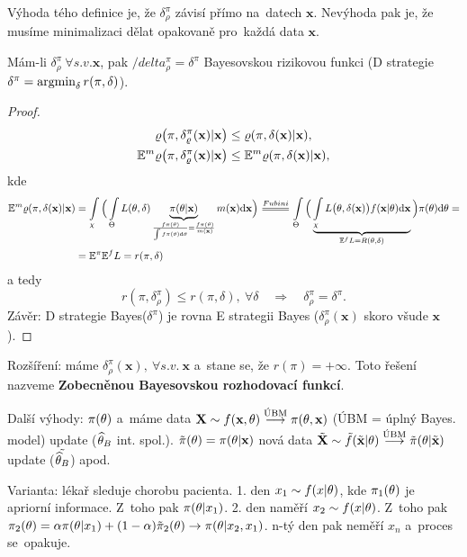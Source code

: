 \begin{remark}
	Výhoda tého definice je, že $\delta_\rho^\pi$ závisí přímo na~datech $\textbf{x}$. Nevýhoda pak je, že musíme minimalizaci dělat opakovaně pro~každá data $\textbf{x}$.
\end{remark}
\begin{theorem}
	Mám-li $\delta_\rho^\pi~\forall s.v.\textbf{x}$, pak $/delta_\rho^\pi=\delta^\pi$ Bayesovskou rizikovou funkci (D strategie $\delta^\pi=\mathop{\mathrm{argmin}}_\delta r(\pi,\delta)$).
	\begin{proof}
		\[
		\begin{split}
		\varrho\big(\pi,\delta_\varrho^\pi(\textbf{x})|\textbf{x}\big)&\leq \varrho(\pi,\delta(\textbf{x})|\textbf{x}), \\
		\mathbb{E}^m\varrho\big(\pi,\delta_\varrho^\pi(\textbf{x})|\textbf{x}\big)&\leq \mathbb{E}^m\varrho(\pi,\delta(\textbf{x})|\textbf{x}),
		\end{split}
		\]
		kde
		\[
		\begin{split}
		\E^m\rho(\pi,\delta(\textbf{x})|\textbf{x})&=\int\limits_{\chi}\Big( \int\limits_{\Theta} L(\t,\delta)\underbrace{\pi(\t|\textbf{x})}_{\frac{f\pi(\t)}{\int f\pi(\t)\d\t}=\frac{f\pi(\t)}{m(\textbf{x})}}m(\textbf{x})\d\textbf{x}\Big)\equal{Fubini}\int\limits_{\Theta}\Big( \underbrace{\int\limits_{\chi} L\big(\t,\delta(\textbf{x})\big)f(\textbf{x}|\t)\d\textbf{x}}_{\E^f L=R(\t,\delta)} \Big)\pi(\t)\d\t=\\&=\E^\pi\E^f L=r(\pi,\delta) 
		\end{split}
		\]
		a tedy 
		$$ r(\pi,\delta_\rho^\pi)\leq r(\pi,\delta),~\forall\delta\quad \Rightarrow\quad \delta_\rho^\pi=\delta^\pi.$$
		Závěr: D strategie Bayes($\delta^\pi$) je rovna E strategii Bayes ($\delta_\rho^\pi(\textbf{x})$ skoro všude $\textbf{x}$).
	\end{proof} 
\end{theorem}
Rozšíření: máme $\delta_\rho^\pi(\textbf{x}),~\forall s.v.~ \textbf{x}$ a~stane se, že $r(\pi)=+\infty$. Toto řešení nazveme \textbf{Zobecněnou Bayesovskou rozhodovací funkcí}.

Další výhody: $\pi(\theta)$ a~máme data $\textbf{X}\sim f(\textbf{x},\theta)\stackrel{\text{ÚBM}}{\longrightarrow}\pi(\theta,\textbf{x})$ (ÚBM = úplný Bayes. model) update ($\widehat{\theta}_B$ int. spol.). $\tilde{\pi}(\theta)=\pi(\theta|\textbf{x})$ nová data $\tilde{\textbf{X}}\sim\tilde{f}(\tilde{\textbf{x}}|\theta)\stackrel{\text{ÚBM}}{\longrightarrow}\tilde{\pi}(\theta|\tilde{\textbf{x}})$ update ($\tilde{\widehat{\theta}_B}$) apod. 

\begin{example}
	Varianta: lékař sleduje chorobu pacienta. 1. den $x_1\sim f(x|\theta)$, kde $\pi_1(\theta)$ je apriorní informace. Z~toho pak $\pi(\theta|x_1)$. 2. den naměří $x_2\sim f(x|\theta)$. Z~toho pak $\pi_2(\theta)=\alpha\pi(\theta| x_1)+(1-\alpha)\tilde{\pi}_2(\theta)\to \pi(\theta|x_2,x_1)$. n-tý den pak neměří $x_n$ a~proces se~opakuje.
\end{example}

